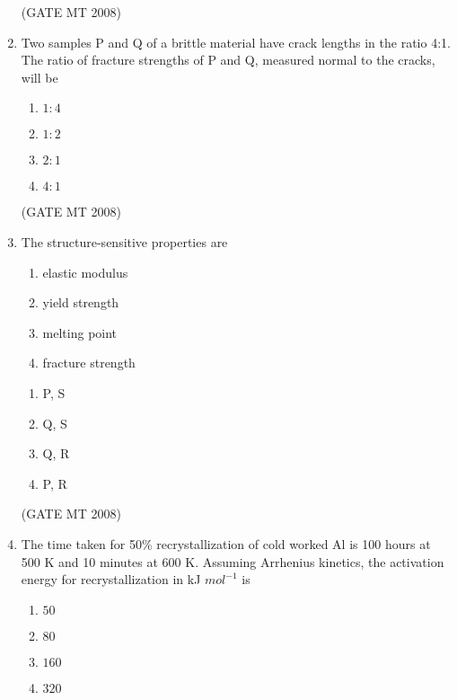 \documentclass[11pt, letterpaper]{article}
\theoremstyle{remark}
\begin{document}
\begin{enumerate}
\hfill(GATE MT 2008)

\item Two samples P and Q of a brittle material have crack lengths in the ratio 4:1. The ratio of fracture strengths of P and Q, measured normal to the cracks, will be 
\begin{multicols}{4}
\begin{enumerate}
\item $1:4$
\item $1:2$
\item $2:1$
\item $4:1$
\end{enumerate}
\end{multicols}

\hfill(GATE MT 2008)

\item The structure-sensitive properties are
\begin{enumerate}
    \item elastic modulus
    \item yield strength
    \item melting point
    \item fracture strength
\end{enumerate}

\begin{multicols}{4}
\begin{enumerate}
\item P, S
\item Q, S
\item Q, R
\item P, R
\end{enumerate}
\end{multicols}

\hfill(GATE MT 2008)

\item The time taken for 50\% recrystallization of cold worked Al is 100 hours at 500 K and 10 minutes at 600 K. Assuming Arrhenius kinetics, the activation energy for recrystallization in kJ $mol^{-1}$ is

\begin{multicols}{4}
\begin{enumerate}
\item $50$
\item $80$
\item $160$
\item $320$
\end{enumerate}
\end{multicols}


\end{enumerate}
\end{document}
